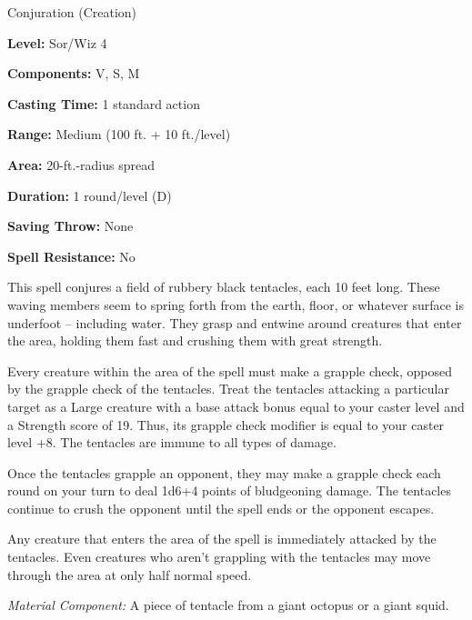 
Conjuration (Creation)

\textbf{Level:} Sor/Wiz 4

\textbf{Components:} V, S, M

\textbf{Casting Time:} 1 standard action

\textbf{Range:} Medium (100 ft. + 10 ft./level)

\textbf{Area:} 20-ft.-radius spread

\textbf{Duration:} 1 round/level (D)

\textbf{Saving Throw:} None

\textbf{Spell Resistance:} No

This spell conjures a field of rubbery black tentacles, each 10 feet long. These 
waving members seem to spring forth from the earth, floor, or whatever surface 
is underfoot -- including water. They grasp and entwine around creatures that enter 
the area, holding them fast and crushing them with great strength.

Every creature within the area of the spell must make a grapple check, opposed 
by the grapple check of the tentacles. Treat the tentacles attacking a particular 
target as a Large creature with a base attack bonus equal to your caster level 
and a Strength score of 19. Thus, its grapple check modifier is equal to your caster 
level +8. The tentacles are immune to all types of damage.

Once the tentacles grapple an opponent, they may make a grapple check each round 
on your turn to deal 1d6+4 points of bludgeoning damage. The tentacles continue 
to crush the opponent until the spell ends or the opponent escapes.

Any creature that enters the area of the spell is immediately attacked by the tentacles. 
Even creatures who aren't grappling with the tentacles may move through the area 
at only half normal speed.

\textit{Material Component:} A piece of tentacle from a giant octopus or a giant 
squid.

